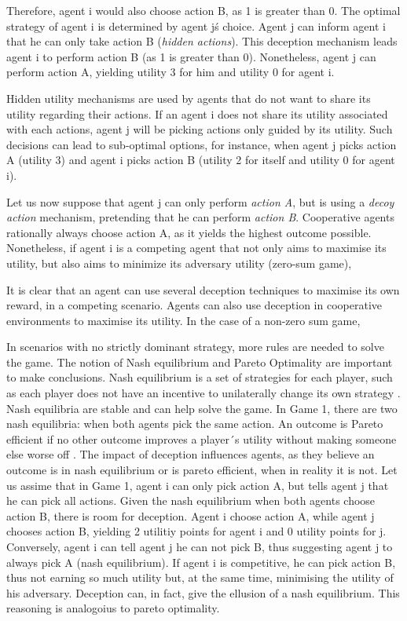 Therefore, agent i would also choose action B, as 1 is greater than 0. The optimal strategy of agent i is determined by agent j\'s choice. Agent j can inform agent i that he can only take action B (\textit{hidden actions}). This deception mechanism leads agent i to perform action B (as 1 is greater than 0). Nonetheless, agent j can perform action A, yielding utility 3 for him and utility 0 for agent i. 

Hidden utility mechanisms are used by agents that do not want to share its utility regarding their actions. If an agent i does not share its utility associated with each actions, agent j will be picking actions only guided by its utility. Such decisions can lead to sub-optimal options, for instance, when agent j picks action A (utility 3) and agent i picks action B (utility 2 for itself and utility 0 for agent i). 
 
Let us now suppose that agent j can only perform \textit{action A}, but is using a \textit{decoy action} mechanism, pretending that he can perform \textit{action B}. Cooperative agents rationally always choose action A, as it yields the highest outcome possible. Nonetheless, if agent i is a competing agent that not only aims to maximise its utility, but also aims to minimize its adversary utility (zero-sum game), 

It is clear that an agent can use several deception techniques to maximise its own reward, in a competing scenario. Agents can also use deception in cooperative environments to maximise its utility. In the case of a non-zero sum game, 

In scenarios with no strictly dominant strategy, more rules are needed to solve the game. The notion of Nash equilibrium and Pareto Optimality are important to make conclusions. Nash equilibrium is a set of strategies for each player, such as each player does not have an incentive to unilaterally change its own strategy \cite{rh}. Nash equilibria are stable and can help solve the game. In Game 1, there are two nash equilibria: when both agents pick the same action. An outcome is Pareto efficient if no other outcome improves a player´s utility without making someone else worse off \cite{rh}. The impact of deception influences agents, as they believe an outcome is in nash equilibrium or is pareto efficient, when in reality it is not. Let us assime that in Game 1, agent i can only pick action A, but tells agent j that he can pick all actions. Given the nash equilibrium when both agents choose action B, there is room for deception. Agent i choose action A, while agent j chooses action B, yielding 2 utilitiy points for agent i and 0 utility points for j. Conversely, agent i can tell agent j he can not pick B, thus suggesting agent j to always pick A (nash equilibrium). If agent i is competitive, he can pick action B, thus not earning so much utility but, at the same time, minimising the utility of his adversary. Deception can, in fact, give the ellusion of a nash equilibrium. This reasoning is analogoius to pareto optimality. 

